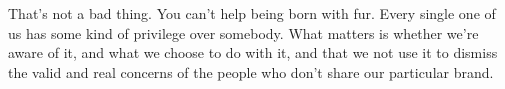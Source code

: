 \documentclass[11pt]{article}
\begin{document}
That's not a bad thing. You can't help being born with fur. Every single one of us has some kind of privilege over somebody. What matters is whether we're aware of it, and what we choose to do with it, and that we not use it to dismiss the valid and real concerns of the people who don't share our particular brand.
\end{document}

